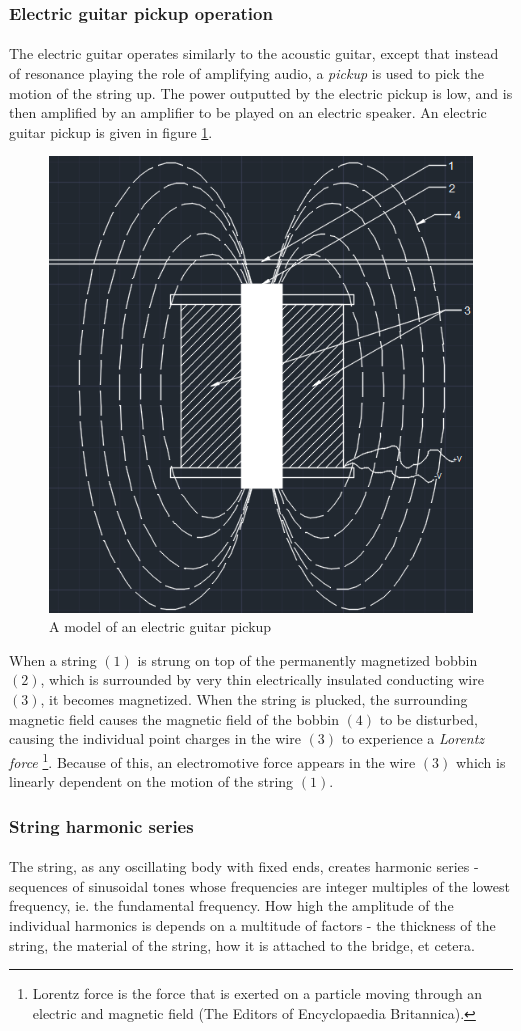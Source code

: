 \documentclass{article}
\begin{document}
\subsubsection{Electric guitar pickup operation}
\paragraph*{}
The electric guitar operates similarly to the acoustic guitar, except that 
instead of resonance playing the role of amplifying audio, a \textit{pickup} 
is used to pick the motion of the string up. The power outputted by the 
electric pickup is low, and is then amplified by an amplifier to be played on 
an electric speaker. An electric guitar pickup is given in figure 
\ref{fig:pickup}. 
\begin{figure}[ht]
	\centering
	\includegraphics[width=.4\textwidth]{img/pickup}
	\caption{A model of an electric guitar pickup}
	\label{fig:pickup}
\end{figure}
When a string $(1)$ is strung on top of the permanently magnetized bobbin 
$(2)$, which is surrounded by very thin electrically insulated conducting wire 
$(3)$, it becomes magnetized. When the string is plucked, the surrounding 
magnetic field causes the magnetic field of the bobbin $(4)$ to be disturbed, 
causing the individual point charges in the wire $(3)$ to experience a 
\textit{Lorentz force}
\footnote{Lorentz force is the force that is exerted on a particle moving 
	through an electric and magnetic field (The Editors of Encyclopaedia 
Britannica).}. Because of this, an electromotive force appears in the wire 
$(3)$ which is linearly dependent on the motion of the string $(1)$.

\subsubsection{String harmonic series}
\paragraph*{} 
The string, as any oscillating body with fixed ends, creates harmonic series - 
sequences of sinusoidal tones whose frequencies are integer multiples of the 
lowest frequency, ie. the fundamental frequency. How high the amplitude of the 
individual harmonics is depends on a multitude of factors - the thickness of 
the string, the material of the string, how it is attached to the bridge, 
et cetera.
\end{document}
